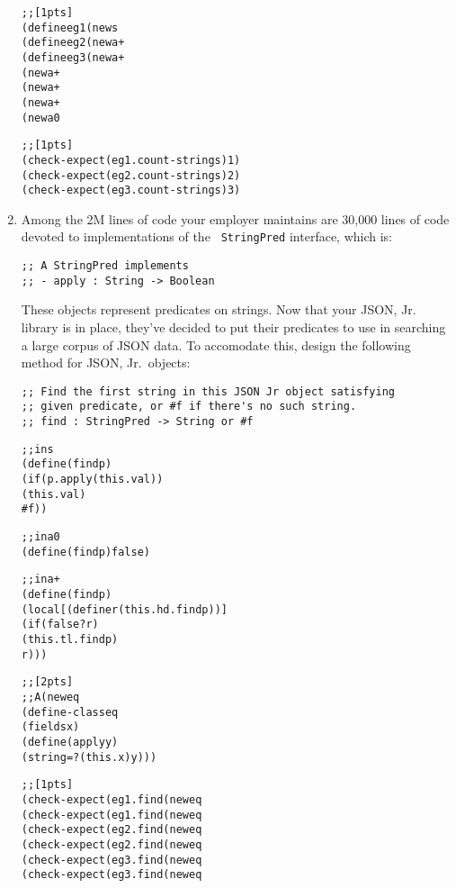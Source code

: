 \documentclass[12pt]{article}                   %
\begin{document}
\begin{problem}
\begin{enumerate}
\begin{alltt}
;; [1pts]
(define eg1 (new s% "This is JSON"))
(define eg2 (new a+% eg1 (new a+% (new s% "Jr.") (new a0%))))
(define eg3 (new a+% (new a0%)
                 (new a+% (new a+% (new s% "So")
                               (new a+% (new s% "is") (new a0%)))
                      (new a+% (new s% "this")
                           (new a0%)))))

;; [1pts]
(check-expect (eg1 . count-strings) 1)
(check-expect (eg2 . count-strings) 2)
(check-expect (eg3 . count-strings) 3)
\end{alltt}
\else
\fi
\newpage
\item Among the 2M lines of code your employer maintains are 30,000
  lines of code devoted to implementations of the {\tt
    StringPred} interface, which is:
\begin{verbatim}
;; A StringPred implements
;; - apply : String -> Boolean
\end{verbatim}
These objects represent predicates on strings.  Now that your JSON,
Jr. library is in place, they've decided to put their predicates to
use in searching a large corpus of JSON data.  To accomodate this,
design the following method for JSON, Jr.~objects:
\begin{verbatim}
;; Find the first string in this JSON Jr object satisfying
;; given predicate, or #f if there's no such string.
;; find : StringPred -> String or #f
\end{verbatim}
\ifrubric
\begin{alltt}
;; in s%  [2pts]
(define (find p)
  (if (p . apply (this . val))
      (this . val)
      #f))

;; in a0% [1pts]
(define (find p) false)

;; in a+% [3pts]
(define (find p)
  (local [(define r (this . hd . find p))]
    (if (false? r)
        (this . tl . find p)
        r)))

;; [2pts]
;; A (new eq% String) implements StringPred
(define-class eq%
  (fields x)
  (define (apply y)
    (string=? (this . x) y)))

;; [1pts]
(check-expect (eg1 . find (new eq% "This is JSON")) "This is JSON")
(check-expect (eg1 . find (new eq% "this")) false)
(check-expect (eg2 . find (new eq% "This is JSON")) "This is JSON")
(check-expect (eg2 . find (new eq% "this")) false)
(check-expect (eg3 . find (new eq% "This is JSON")) false)
(check-expect (eg3 . find (new eq% "this")) "this")
\end{alltt}
\else
\fi
\end{enumerate}
\end{problem}
\end{document}
